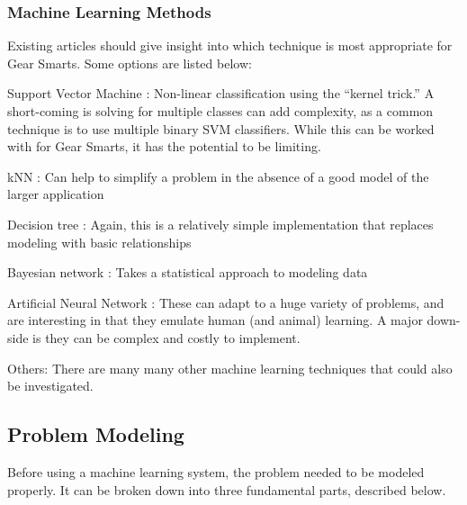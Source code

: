 \subsubsection{Machine Learning Methods}
\label{section:mloptions}
Existing articles should give insight into which technique is
most appropriate for Gear Smarts. Some options are listed below:

\begin{description}
  \item{Support Vector Machine \cite{SVM}:} Non-linear classification using the ``kernel trick.'' A short-coming is solving for multiple
  classes can add complexity, as a common technique is to use multiple binary SVM classifiers. While this can be worked with
  for Gear Smarts, it has the potential to be limiting.
  \item{kNN \cite{KNN}:} Can help to simplify a problem in the absence of a good model of the larger application
  \item{Decision tree \cite{DecisionTree}:} Again, this is a relatively simple implementation that replaces modeling with basic relationships
  \item{Bayesian network \cite{BayesianNetwork}:} Takes a statistical approach to modeling data
  \item{Artificial Neural Network \cite{ANN}:} These can adapt to a huge variety of problems, and are interesting in that they emulate
  human (and animal) learning. A major down-side is they can be complex and costly to implement.
  \item{Others:} There are many many other machine learning techniques that could also be investigated.
\end{description}

\subsection{Problem Modeling}
Before using a machine learning system, the problem needed to be modeled properly. It can be broken down into three
fundamental parts, described below.


